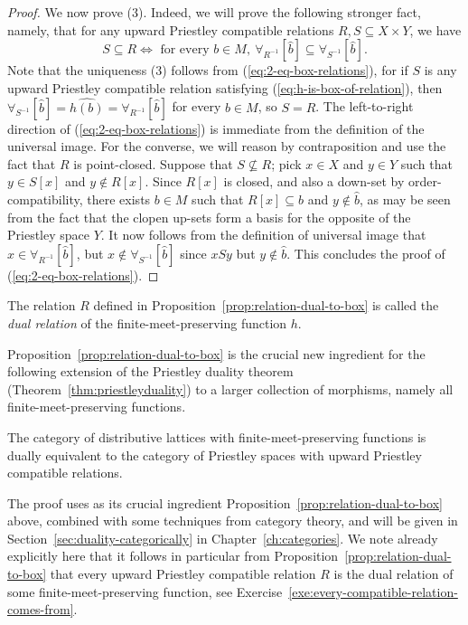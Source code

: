 \begin{proof}
	We now prove (3). Indeed, we will prove the following stronger fact, namely, that for any upward Priestley compatible relations $R, S \subseteq X \times Y$, we have
	\begin{equation} \label{eq:2-eq-box-relations}
		S \subseteq R \iff \text{ for every } b \in M, \ \forall_{R^{-1}}[\widehat{b}] \subseteq \forall_{S^{-1}}[\widehat{b}].
	\end{equation}
	Note that the uniqueness (3) follows from (\ref{eq:2-eq-box-relations}), for if $S$ is any upward Priestley compatible relation satisfying (\ref{eq:h-is-box-of-relation}), then $\forall_{S^{-1}}[\widehat{b}] = \widehat{h(b)} = \forall_{R^{-1}}[\widehat{b}]$ for every $b \in M$, so $S = R$. The left-to-right direction of (\ref{eq:2-eq-box-relations}) is immediate from the definition of the universal image. For the converse, we will reason by contraposition and use the fact that $R$ is point-closed. Suppose that $S \not\subseteq R$; pick $x \in X$ and $y \in Y$ such that $y \in S[x]$ and $y \not\in R[x]$. Since $R[x]$ is closed, and also a down-set by order-compatibility, there exists $b \in M$ such that $R[x] \subseteq \widehat{b}$ and $y \not\in \widehat{b}$, as may be seen from the fact that the clopen up-sets form a basis for the opposite of the Priestley space $Y$. It now follows from the definition of universal image that $x \in \forall_{R^{-1}}[\widehat{b}]$, but $x \not\in \forall_{S^{-1}}[\widehat{b}]$ since $x{S}y$ but $y \not\in \widehat{b}$. This concludes the proof of (\ref{eq:2-eq-box-relations}).
\end{proof}

\begin{definition}\label{dfn:relation-dual-to-box}
	The relation $R$ defined in Proposition~\ref{prop:relation-dual-to-box} is called the \emph{dual relation} of the finite-meet-preserving function $h$.
\end{definition}

Proposition~\ref{prop:relation-dual-to-box} is the crucial new ingredient for the following extension of the Priestley duality theorem (Theorem~\ref{thm:priestleyduality}) to a larger collection of morphisms, namely all finite-meet-preserving functions.
\begin{theorem}\label{thm:unaryboxduality}
The category of distributive lattices with finite\hyp{}meet\hyp{}preserving functions is dually equivalent to the category of Priestley spaces with upward Priestley compatible relations.
\end{theorem} 
The proof uses as its crucial ingredient Proposition~\ref{prop:relation-dual-to-box} above, combined with some techniques from category theory, and will be given in Section~\ref{sec:duality-categorically} in Chapter~\ref{ch:categories}. We note already explicitly here that it follows in particular from Proposition~\ref{prop:relation-dual-to-box} that every upward Priestley compatible relation $R$ is the dual relation of some finite-meet-preserving function, see Exercise~\ref{exe:every-compatible-relation-comes-from}.


